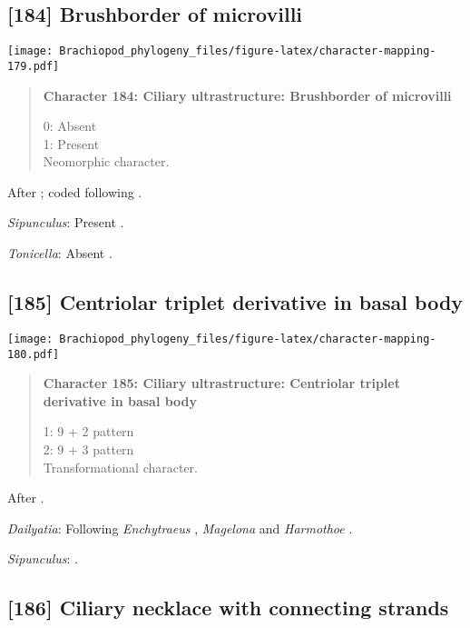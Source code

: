 \documentclass[openany]{book}
\theoremstyle{definition}
\theoremstyle{definition}
\theoremstyle{definition}
\theoremstyle{remark}
\begin{document}
\subsection*{{[}184{]} Brushborder of
microvilli}\label{brushborder-of-microvilli}

\texttt{[image: Brachiopod\_phylogeny\_files/figure-latex/character-mapping-179.pdf]}

\begin{quote}
\textbf{Character 184: Ciliary ultrastructure: Brushborder of
microvilli}

0: Absent\\
1: Present\\
Neomorphic character.
\end{quote}

After \citet{Lundin2009}; coded following \citet{Smith2012}.

\hypertarget{Sipunculus-coding-184}{}
\emph{Sipunculus}: Present \citep{Reed1982}.

\hypertarget{Tonicella-coding-184}{}
\emph{Tonicella}: Absent \citep{Luter1995}.

\subsection*{{[}185{]} Centriolar triplet derivative in basal
body}\label{centriolar-triplet-derivative-in-basal-body}

\texttt{[image: Brachiopod\_phylogeny\_files/figure-latex/character-mapping-180.pdf]}

\begin{quote}
\textbf{Character 185: Ciliary ultrastructure: Centriolar triplet
derivative in basal body}

1: 9 + 2 pattern\\
2: 9 + 3 pattern\\
Transformational character.
\end{quote}

After \citet{Lundin2009}.

\hypertarget{Dailyatia-coding-185}{}
\emph{Dailyatia}: Following \emph{Enchytraeus} \citep{Reger1967},
\emph{Magelona} \citep{Bartolomaeus1995} and \emph{Harmothoe}
\citep{Holborow1969}.

\hypertarget{Sipunculus-coding-185}{}
\emph{Sipunculus}: \citet{Reed1982}.

\subsection*{{[}186{]} Ciliary necklace with connecting
strands}\label{ciliary-necklace-with-connecting-strands}
\end{document}
